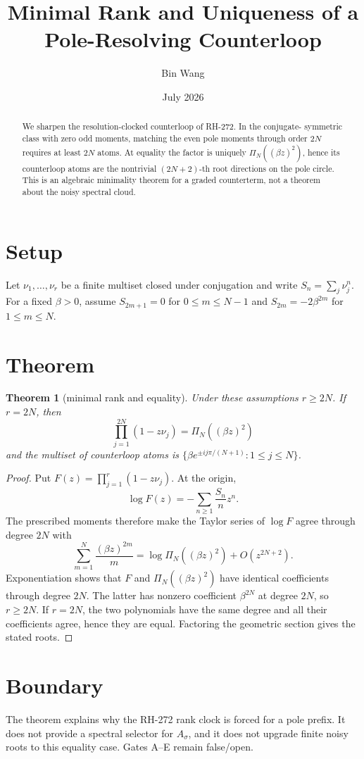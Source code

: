 \documentclass[11pt]{article}
\title{Minimal Rank and Uniqueness of a Pole-Resolving Counterloop}\author{Bin Wang}\date{July 2026}
\newtheorem{theorem}{Theorem}[section]\newtheorem{proposition}[theorem]{Proposition}
\begin{document}
\maketitle
\begin{abstract}
We sharpen the resolution-clocked counterloop of RH-272.  In the conjugate-
symmetric class with zero odd moments, matching the even pole moments through
order $2N$ requires at least $2N$ atoms.  At equality the factor is uniquely
$\Pi_N((\beta z)^2)$, hence its counterloop atoms are the nontrivial
$(2N+2)$-th root directions on the pole circle.  This is an algebraic
minimality theorem for a graded
counterterm, not a theorem about the noisy spectral cloud.
\end{abstract}
\section{Setup}
Let $\nu_1,\ldots,\nu_r$ be a finite multiset closed under conjugation and
write $S_n=\sum_j\nu_j^n$.  For a fixed $\beta>0$, assume
$S_{2m+1}=0$ for $0\le m\le N-1$ and
$S_{2m}=-2\beta^{2m}$ for $1\le m\le N$.
\section{Theorem}
\begin{theorem}[minimal rank and equality]
Under these assumptions $r\ge2N$.  If $r=2N$, then
\[
 \prod_{j=1}^{2N}(1-z\nu_j)=\Pi_N((\beta z)^2)
\]
and the multiset of counterloop atoms is
$\{\beta e^{\pm i j\pi/(N+1)}:1\le j\le N\}$.
\end{theorem}
\begin{proof}
Put $F(z)=\prod_{j=1}^r(1-z\nu_j)$.  At the origin,
\[
 \log F(z)=-\sum_{n\ge1}\frac{S_n}{n}z^n.
\]
The prescribed moments therefore make the Taylor series of $\log F$ agree
through degree $2N$ with
\[
 \sum_{m=1}^N\frac{(\beta z)^{2m}}m
 =\log\Pi_N((\beta z)^2)+O(z^{2N+2}).
\]
Exponentiation shows that $F$ and $\Pi_N((\beta z)^2)$ have identical
coefficients through degree $2N$.  The latter has nonzero coefficient
$\beta^{2N}$ at degree $2N$, so $r\ge2N$.  If $r=2N$, the two polynomials
have the same degree and all their coefficients agree, hence they are equal.
Factoring the geometric section gives the stated roots.
\end{proof}
\section{Boundary}
The theorem explains why the RH-272 rank clock is forced for a pole prefix.
It does not provide a spectral selector for $A_\sigma$, and it does not
upgrade finite noisy roots to this equality case.  Gates A--E remain false/open.
\end{document}
